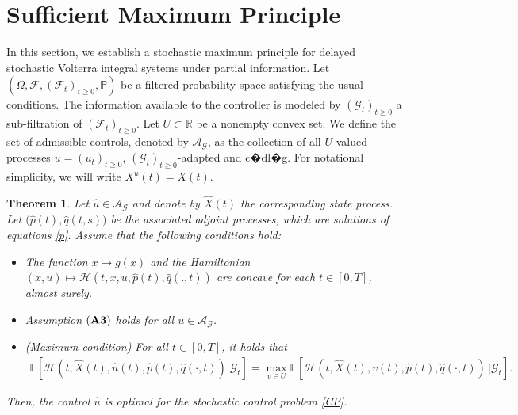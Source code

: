 \documentclass[12pt]{article}
\newtheorem{theorem}{Theorem}[section]
\theoremstyle{remark}
\numberwithin{equation}{section}
\begin{document}
\section{Sufficient Maximum Principle}\label{sec:sufficient}
In this section, we establish a stochastic maximum principle for delayed stochastic Volterra integral systems under partial information. Let $(\Omega,\mathcal{F},(\mathcal{F}_t)_{t \geq 0},\mathbb{P})$ be a filtered probability space satisfying the usual conditions. The information available to the controller is modeled by $(\mathcal{G}_t)_{t \geq 0}$ a sub-filtration of  $(\mathcal{F}_t)_{t \geq 0}$. Let $U \subset \mathbb{R}$ be a nonempty convex set. We define the set of admissible controls, denoted by $\mathcal{A}_{\mathcal{G}}$, as the collection of all $U$-valued processes $u = (u_t)_{t \geq 0}$, $(\mathcal{G}_t)_{t \geq 0}$-adapted and c�dl�g. For notational simplicity, we will write $X^{u}(t) = X(t)$.
\begin{theorem}
Let $\hat{u} \in \mathcal{A}_{\mathcal{G}}$ and denote by $\hat{X}(t)$ the corresponding state process. Let $\big(\hat{p}(t), \hat{q}(t,s)\big)$ be the associated adjoint processes, which are solutions of equations \eqref{p}.
Assume that the following conditions hold:
\begin{itemize}
\item[(i)] The function $x \mapsto g(x)$ and the Hamiltonian $(x, u) \mapsto \mathcal{H}(t, x, u, \hat{p}(t), \hat{q}(.,t))$ are concave for each $t \in [0,T]$, almost surely.
\item[(ii)] Assumption $({\bf A3})$ holds for all $u \in \mathcal{A}_{\mathcal{G}}$.
\item[(iii)] (Maximum condition) For all $t \in [0,T]$, it holds that
\begin{eqnarray}\label{Ep002}
	\mathbb{E} \left[ \mathcal{H}(t, \hat{X}(t), \hat{u}(t), \hat{p}(t), \hat{q}(\cdot,t))|\mathcal{G}_t\right]
= \max_{v \in U} \mathbb{E} \left[\mathcal{H}(t, \hat{X}(t), v(t), \hat{p}(t), \hat{q}(\cdot,t)) \,\big|\mathcal{G}_t\right].
\end{eqnarray}
\end{itemize}
Then, the control $\hat{u}$ is optimal for the stochastic control problem \eqref{CP}.
\end{theorem}
\end{document}
